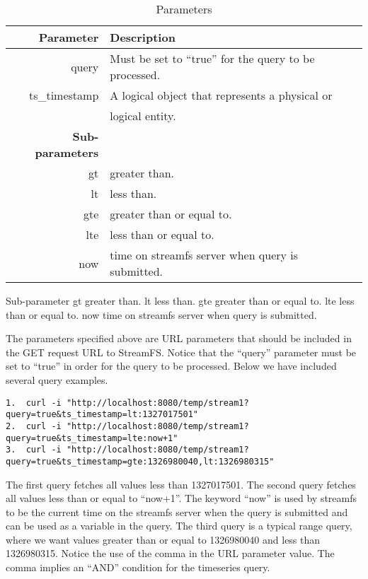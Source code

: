\begin{table}[h]
\begin{center}
\begin{tabular}{| r | l | l |}
	\hline
	\textbf{Parameter} & \textbf{Description} \\ \hline


	query & Must be set to ``true'' for the query to be processed.  \\ \hline

	ts\_timestamp & A logical object that represents a physical or  \\
				  & logical entity. 							 	\\ \hline


	\textbf{Sub-parameters} & 										\\ \hline
	gt 			& greater than. 									\\ \hline
	lt		   	& less than.  										\\ \hline
	gte		   	& greater than or equal to. 						\\ \hline
	lte		   	& less than or equal to.							\\ \hline
	now		   	& time on streamfs server when query is submitted. 	\\ \hline

\end{tabular}
\caption{Parameters}
\label{tab:parameters}
\end{center}
\end{table}


Sub-parameter	
gt	 greater than.
lt	 less than.
gte	 greater than or equal to.
lte	 less than or equal to.
now	 time on streamfs server when query is submitted.

The parameters specified above are URL parameters that should be included in the GET request URL to StreamFS. Notice that the ``query'' parameter must be set to ``true'' in order for the query to be processed. Below we have included several query examples.

\begin{lstlisting}
1.  curl -i "http://localhost:8080/temp/stream1?query=true&ts_timestamp=lt:1327017501"
2.  curl -i "http://localhost:8080/temp/stream1?query=true&ts_timestamp=lte:now+1"
3.  curl -i "http://localhost:8080/temp/stream1?query=true&ts_timestamp=gte:1326980040,lt:1326980315"
\end{lstlisting}

The first query fetches all values less than 1327017501. The second query fetches all values less than or equal to ``now+1''. 
The keyword ``now'' is used by streamfs to be the current time on the streamfs server when the query is submitted and can be used 
as a variable in the query. The third query is a typical range query, where we want values greater than or equal to 
1326980040 and less than 1326980315. Notice the use of the comma in the URL parameter value. The comma implies an ``AND''
 condition for the timeseries query.

